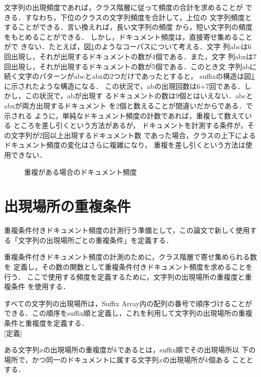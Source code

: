 文字列の出現頻度であれば，クラス階層に従って頻度の合計を求めることが
できる．すなわち，下位のクラスの文字列頻度を合計して，上位の
文字列頻度とすることができる．言い換えれば，長い文字列の頻度
から，短い文字列の頻度をもとめることができる．
しかし，ドキュメント頻度は，直接寄せ集めることがで
きない．たとえば，図\ref{chofuku_df}のようなコーパスについて考える．文字
列abcは6回出現し，それが出現するドキュメントの数が4個である．また，文字
列abxは7回出現し，それが出現するドキュメントの数が5個である．このとき文
字列abに続く文字のパターンがabcとabxの2つだけであったとすると，
suffixの構造は図\ref{chofuku_df}に示されたような構造になる．
この状況で，abの出現回数は6+7回である．しかし，この状況で，abが出現す
るドキュメントの数は9個とはいえない．abcとabxが両方出現するドキュメント
を2個と数えることが間違いだからである．\cite{DF1}で示される
ように，単純なドキュメント頻度の計数であれば，重複して数えている
ところを差し引くという方法があるが，
ドキュメントを計測する条件が，その文字列が2回以上出現するドキュメント数
であった場合，クラスの上下によるドキュメント頻度の変化はさらに複雑になり，
重複を差し引くという方法は使用できない．

 \begin{figure}[htbp]
  \begin{center}
   \epsfxsize=12cm
   
   \caption{重複がある場合のドキュメント頻度}
   \label{chofuku_df}
  \end{center}
 \end{figure}

\section{出現場所の重複条件}

重複条件付きドキュメント頻度の計測行う準備として，この論文で新しく使用す
る「文字列の出現場所ごとの重複条件」を定義する．

重複条件付きドキュメント頻度の計測のために，クラス階層で寄せ集められる数を
定義し，その数の関数として重複条件付きドキュメント頻度を求めることを行う．
ここで使用する頻度を定義するために，文字列の出現場所の重複度と重複条件
を使用する．

すべての文字列の出現場所は，Suffix Array内の配列の番号で順序づけることが
できる．この順序をsuffix順と定義し，これを利用して文字列の出現場所の重複
条件と重複度を定義する．\\

[定義]\par
ある文字列$x$の出現場所の重複度が$k$であるとは，suffix順でその出現場所以
下の場所で，かつ同一のドキュメントに属する文字列$x$の出現場所が$k$個ある
こととする．\\
\par

